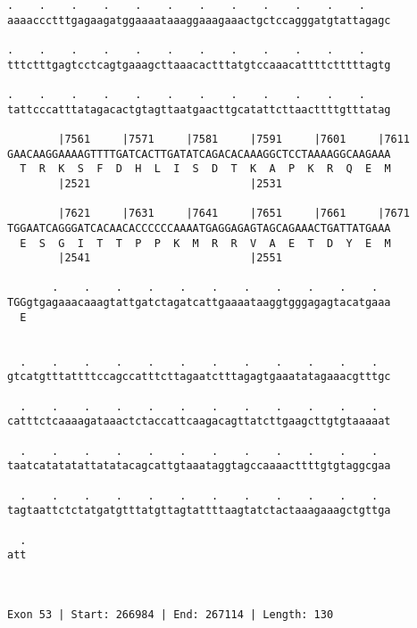 \documentclass{article}
\begin{document}
\begin{Verbatim}
.    .    .    .    .    .    .    .    .    .    .    .    
aaaaccctttgagaagatggaaaataaaggaaagaaactgctccagggatgtattagagc
                                                            
.    .    .    .    .    .    .    .    .    .    .    .    
tttctttgagtcctcagtgaaagcttaaacactttatgtccaaacattttctttttagtg
                                                            
.    .    .    .    .    .    .    .    .    .    .    .    
tattcccatttatagacactgtagttaatgaacttgcatattcttaacttttgtttatag
                                                            
        |7561     |7571     |7581     |7591     |7601     |7611
GAACAAGGAAAAGTTTTGATCACTTGATATCAGACACAAAGGCTCCTAAAAGGCAAGAAA
  T  R  K  S  F  D  H  L  I  S  D  T  K  A  P  K  R  Q  E  M
        |2521                         |2531                 
  
        |7621     |7631     |7641     |7651     |7661     |7671
TGGAATCAGGGATCACAACACCCCCCAAAATGAGGAGAGTAGCAGAAACTGATTATGAAA
  E  S  G  I  T  T  P  P  K  M  R  R  V  A  E  T  D  Y  E  M
        |2541                         |2551                 
  
       .    .    .    .    .    .    .    .    .    .    .  
TGGgtgagaaacaaagtattgatctagatcattgaaaataaggtgggagagtacatgaaa
  E                                                         
                                                            
  
  .    .    .    .    .    .    .    .    .    .    .    .  
gtcatgtttattttccagccatttcttagaatctttagagtgaaatatagaaacgtttgc
                                                            
  .    .    .    .    .    .    .    .    .    .    .    .  
catttctcaaaagataaactctaccattcaagacagttatcttgaagcttgtgtaaaaat
                                                            
  .    .    .    .    .    .    .    .    .    .    .    .  
taatcatatatattatatacagcattgtaaataggtagccaaaacttttgtgtaggcgaa
                                                            
  .    .    .    .    .    .    .    .    .    .    .    .  
tagtaattctctatgatgtttatgttagtattttaagtatctactaaagaaagctgttga
                                                            
  .
att
   
   
 
Exon 53 | Start: 266984 | End: 267114 | Length: 130




\end{Verbatim}
\end{document}
